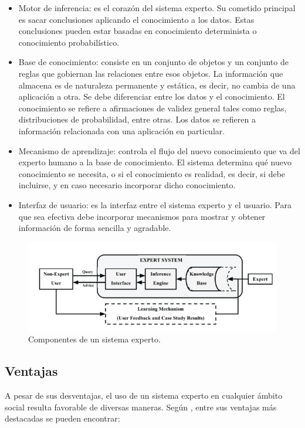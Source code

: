 \begin{itemize}
\item Motor de inferencia: es el corazón del sistema experto. Su cometido principal es sacar conclusiones aplicando el conocimiento a los datos. Estas conclusiones pueden estar basadas en conocimiento determinista o conocimiento probabilístico.
\item Base de conocimiento: consiste en un conjunto de objetos y un conjunto de reglas que gobiernan las relaciones entre esos objetos. La información que almacena es de naturaleza permanente y estática, es decir, no cambia de una aplicación a otra. Se debe diferenciar entre los datos y el conocimiento. El conocimiento se refiere a afirmaciones de validez general tales como reglas, distribuciones de probabilidad, entre otras. Los datos se refieren a información relacionada con una aplicación en particular.
\item Mecanismo de aprendizaje: controla el flujo del nuevo conocimiento que va del experto humano a la base de conocimiento. El sistema determina qué nuevo conocimiento se necesita, o si el conocimiento es realidad, es decir, si debe incluirse, y en caso necesario incorporar dicho conocimiento.
\item Interfaz de usuario: es la interfaz entre el sistema experto y el usuario. Para que sea efectiva debe incorporar mecanismos para mostrar y obtener información de forma sencilla y agradable.
\end{itemize}

\begin{figure}[h]
\centering
 \includegraphics[width=0.8\linewidth]{imagen/ComponentesSE.png}
 \caption{Componentes de un sistema experto.}
 \label{fig:componentesSE} 
\end{figure}

\subsection{Ventajas}
A pesar de sus desventajas, el uso de un sistema experto en cualquier ámbito social resulta favorable de diversas maneras. Según \cite{Mitchell1990}, entre sus ventajas más destacadas se pueden encontrar:

